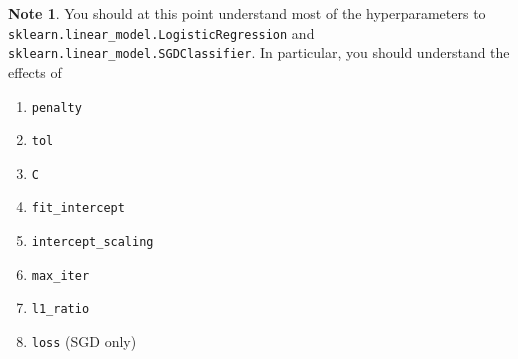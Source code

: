 \documentclass[10pt]{exam}
\theoremstyle{definition}
\newtheorem{problem}{Problem}
\newtheorem{note}{Note}
\newcommand{\Ein}{E_{\text{in}}}
\begin{document}
    \vspace{3in}
\begin{note}
    You should at this point understand most of the hyperparameters to 
    \lstinline{sklearn.linear_model.LogisticRegression} and 
    \lstinline{sklearn.linear_model.SGDClassifier}. 
    In particular, you should understand the effects of
    \begin{enumerate}
        \item \lstinline{penalty}
        \item \lstinline{tol}
        \item \lstinline{C}
        \item \lstinline{fit_intercept}
        \item \lstinline{intercept_scaling}
        \item \lstinline{max_iter}
        \item \lstinline{l1_ratio}
        \item \lstinline{loss} (SGD only)
    \end{enumerate}
\end{note}



\end{document}
